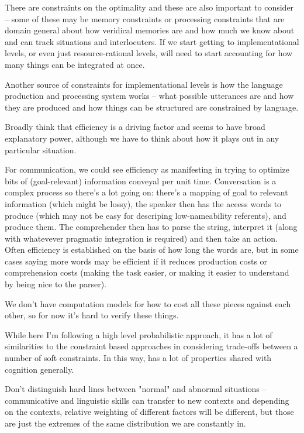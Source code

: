 \documentclass[]{article}
\begin{document}
There are constraints on the optimality and these are also important to consider -- some of these may be memory constraints or processing constraints that are domain general about how veridical memories are and how much we know about and can track situations and interlocuters. If we start getting to implementational levels, or even just resource-rational levels, will need to start accounting for how many things can be integrated at once. 

Another source of constraints for implementational levels is how the language production and processing system works -- what possible utterances are and how they are produced and how things can be structured are constrained by language. 

Broadly think that efficiency is a driving factor and seems to have broad explanatory power, although we have to think about how it plays out in any particular situation. 

For communication, we could see efficiency as manifesting in trying to optimize bits of (goal-relevant) information conveyal per unit time. Conversation is a complex process so there's a lot going on: there's a mapping of goal to relevant information (which might be lossy), the speaker then has the access words to produce (which may not be easy for descriping low-nameability referents), and produce them. The comprehender then has to parse the string, interpret it (along with whatevever pragmatic integration is required) and then take an action. Often efficiency is established on the basis of how long the words are, but in some cases saying more words may be efficient if it reduces production costs or comprehension costs (making the task easier, or making it easier to understand by being nice to the parser). 

We don't have computation models for how to cost all these pieces against each other, so for now it's hard to verify these things. 

While here I'm following a high level probabilistic approach, it has a lot of similarities to the constraint based approaches in considering trade-offs between a number of soft constraints. In this way, has a lot of properties shared with cognition generally. 

Don't distinguish hard lines between "normal" and abnormal situations -- communicative and linguistic skills can transfer to new contexts and depending on the contexts, relative weighting of different factors will be different, but those are just the extremes of the same distribution we are constantly in. 
\end{document}
